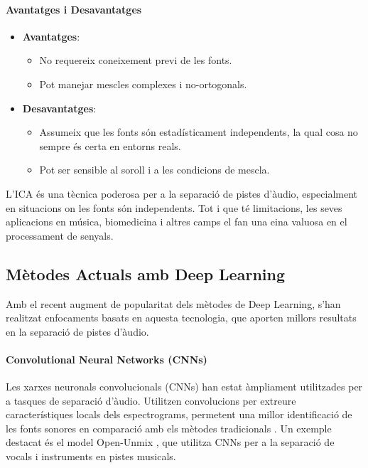 \documentclass[10pt,a4paper,twocolumn,twoside]{article}
\begin{document}
\paragraph{Avantatges i Desavantatges}
\begin{itemize}
    \item \textbf{Avantatges}: 
        \begin{itemize}
            \item No requereix coneixement previ de les fonts.
            \item Pot manejar mescles complexes i no-ortogonals.
        \end{itemize}
    \item \textbf{Desavantatges}: 
        \begin{itemize}
            \item Assumeix que les fonts són estadísticament independents, la qual cosa no sempre és certa en entorns reals.
            \item Pot ser sensible al soroll i a les condicions de mescla.
        \end{itemize}
\end{itemize}

L'ICA és una tècnica poderosa per a la separació de pistes d'àudio, especialment en situacions on les fonts són independents. Tot i que té limitacions, les seves aplicacions en música, biomedicina i altres camps el fan una eina valuosa en el processament de senyals.



\subsection{Mètodes Actuals amb Deep Learning}
Amb el recent augment de popularitat dels mètodes de Deep Learning, s'han realitzat enfocaments basats en aquesta tecnologia, que aporten millors resultats en la separació de pistes d'àudio.

\paragraph{Convolutional Neural Networks (CNNs)}
Les xarxes neuronals convolucionals (CNNs) han estat àmpliament utilitzades per a tasques de separació d'àudio. Utilitzen convolucions per extreure característiques locals dels espectrograms, permetent una millor identificació de les fonts sonores en comparació amb els mètodes tradicionals \cite{CNN_jansson2017singing}. Un exemple destacat és el model Open-Unmix \cite{CNN_Stöter2019}, que utilitza CNNs per a la separació de vocals i instruments en pistes musicals.
\end{document}
